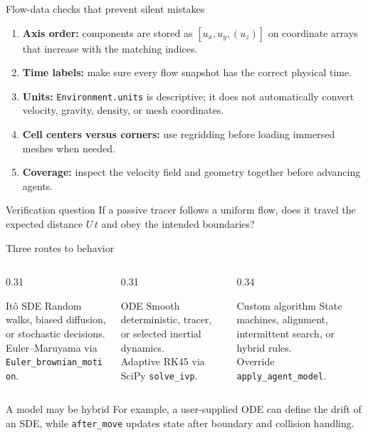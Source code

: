 \documentclass[aspectratio=169,11pt]{beamer}
\newcommand{\code}[1]{\texttt{#1}}
\begin{document}
\begin{frame}{Flow-data checks that prevent silent mistakes}
\begin{enumerate}
  \item \textbf{Axis order:} components are stored as $[u_x,u_y,(u_z)]$ on coordinate arrays that increase with the matching indices.
  \item \textbf{Time labels:} make sure every flow snapshot has the correct physical time.
  \item \textbf{Units:} \code{Environment.units} is descriptive; it does not automatically convert velocity, gravity, density, or mesh coordinates.
  \item \textbf{Cell centers versus corners:} use regridding before loading immersed meshes when needed.
  \item \textbf{Coverage:} inspect the velocity field and geometry together before advancing agents.
\end{enumerate}
\begin{alertblock}{Verification question}
If a passive tracer follows a uniform flow, does it travel the expected distance $U\,t$ and obey the intended boundaries?
\end{alertblock}
\end{frame}

\begin{frame}{Three routes to behavior}
\begin{columns}[T,onlytextwidth]
  \begin{column}{0.31\textwidth}
    \begin{block}{It\^o SDE}
      \small Random walks, biased diffusion, or stochastic decisions.\\[3pt]
      \scriptsize Euler--Maruyama via \code{Euler\_brownian\_motion}.
    \end{block}
  \end{column}
  \begin{column}{0.31\textwidth}
    \begin{block}{ODE}
      \small Smooth deterministic, tracer, or selected inertial dynamics.\\[3pt]
      \scriptsize Adaptive RK45 via SciPy \code{solve\_ivp}.
    \end{block}
  \end{column}
  \begin{column}{0.34\textwidth}
    \begin{block}{Custom algorithm}
      \small State machines, alignment, intermittent search, or hybrid rules.\\[3pt]
      \scriptsize Override \code{apply\_agent\_model}.
    \end{block}
  \end{column}
\end{columns}
\begin{block}{A model may be hybrid}
For example, a user-supplied ODE can define the drift of an SDE, while \code{after\_move} updates state after boundary and collision handling.
\end{block}
\end{frame}
\end{document}
